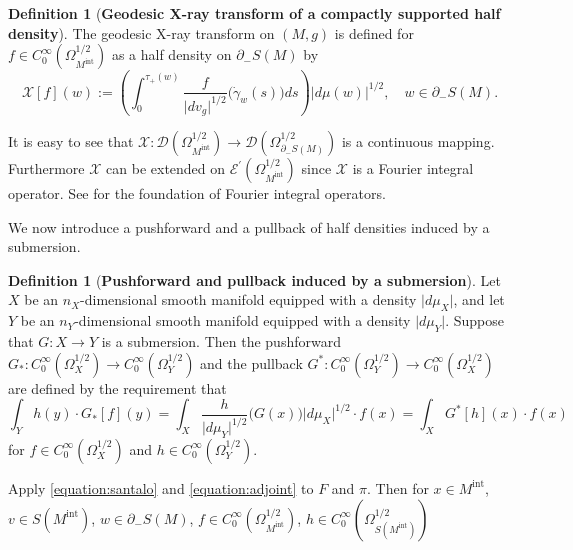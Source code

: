 \documentclass[a4paper,11pt,reqno]{amsart}
\numberwithin{equation}{section}
\theoremstyle{definition}
\newtheorem{definition}[theorem]{Definition}
\theoremstyle{remark}
\begin{document}
%
%
\begin{definition}[{\bf Geodesic X-ray transform of a compactly supported half density}] 
\label{theorem:geodesicxraytransform}
The geodesic X-ray transform on $(M,g)$ is defined for $f \in C^\infty_0(\Omega_{M^\text{int}}^{1/2})$ as a half density on $\partial_-S(M)$ by 
%
%
\begin{equation}
\mathcal{X}[f](w)
:=
\left(
\int_0^{\tau_+(w)}
\frac{f}{\lvert{dv_g}\rvert^{1/2}}
\bigl(\dot{\gamma}_w(s)\bigr)
ds
\right)
\lvert{d\mu(w)}\rvert^{1/2},
\quad
w \in \partial_-S(M). 
\label{equation:geodesicxraytransform} 
\end{equation}
%
%
\end{definition} 
%
%
It is easy to see that 
$\mathcal{X}: \mathscr{D}(\Omega_{M^\text{int}}^{1/2}) \rightarrow \mathscr{D}(\Omega_{\partial_-S(M)}^{1/2})$ 
is a continuous mapping. Furthermore $\mathcal{X}$ can be extended on 
$\mathscr{E}^\prime(\Omega_{M^\text{int}}^{1/2})$ since $\mathcal{X}$ is a Fourier integral operator. See \cite[Sections~25.1 and 25.2]{Hoermander4} for the foundation of Fourier integral operators. 
%
%
\par
%
%
We now introduce a pushforward and a pullback of half densities induced by a submersion. 
%
%
\begin{definition}[{\bf Pushforward and pullback induced by a submersion}]
\label{theorem:pushforwardpullback1}
Let $X$ be an $n_X$-dimensional smooth manifold equipped with a density $\lvert{d\mu_X}\rvert$, and let $Y$ be an $n_Y$-dimensional smooth manifold equipped with a density $\lvert{d\mu_Y}\rvert$. 
Suppose that $G: X \rightarrow Y$ is a submersion. 
Then the pushforward $G_\ast: C^\infty_0(\Omega_X^{1/2}) \rightarrow C^\infty_0(\Omega_Y^{1/2})$ and 
the pullback $G^\ast: C^\infty_0(\Omega_Y^{1/2}) \rightarrow C^\infty_0(\Omega_X^{1/2})$ 
are defined by the requirement that 
%
%
\begin{equation}
\int_Y h(y){\cdot}G_\ast[f](y)
=
\int_X \frac{h}{\lvert{d\mu_Y}\rvert^{1/2}}\bigl(G(x)\bigr)\lvert{d\mu_X}\rvert^{1/2}{\cdot}f(x)
=
\int_X G^\ast[h](x){\cdot}f(x)
\label{equation:adjoint}
\end{equation}
%
%
for $f \in C^\infty_0(\Omega_X^{1/2})$ and $h \in C^\infty_0(\Omega_Y^{1/2})$. 
\end{definition}
%
%
Apply \eqref{equation:santalo} and \eqref{equation:adjoint} to $F$ and $\pi$.  
Then for 
$x \in M^\text{int}$, 
$v \in S(M^\text{int})$, 
$w \in \partial_-S(M)$, 
$f \in C^\infty_0(\Omega_{M^\text{int}}^{1/2})$, 
$h \in C^\infty_0(\Omega_{S(M^\text{int})}^{1/2})$ 
\end{document}
